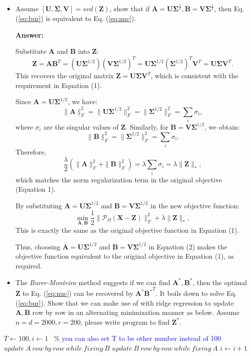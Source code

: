 \documentclass[11pt]{article}
\newcommand{\mtx}[1]{\mathbf{#1}}
\def \mA {\mtx{A}}
\def \mB {\mtx{B}}
\def \mU {\mtx{U}}
\def \mV {\mtx{V}}
\def \mSigma {\mtx{\Sigma}}
\def \mZ {\mtx{Z}}
\begin{document}
\begin{itemize}
	\item Assume $[\mU,\mSigma,\mV]=svd(\mZ)$, show that if $\mA=\mU\mSigma^\frac{1}{2}, \mB=\mV\mSigma^\frac{1}{2}$, then Eq. (\ref{eq:bur}) is equivalent to Eq. (\ref{eq:nuc}).
	
	\textbf{Answer:}

		Substitute \( \mathbf{A} \) and \( \mathbf{B} \) into \( \mathbf{Z} \):
		\[
		\mathbf{Z} = \mathbf{A} \mathbf{B}^T = (\mathbf{U} \mathbf{\Sigma}^{1/2})(\mathbf{V} \mathbf{\Sigma}^{1/2})^T = \mathbf{U} \mathbf{\Sigma}^{1/2} (\mathbf{\Sigma}^{1/2})^T \mathbf{V}^T = \mathbf{U} \mathbf{\Sigma} \mathbf{V}^T.
		\]
		This recovers the original matrix \( \mathbf{Z} = \mathbf{U} \mathbf{\Sigma} \mathbf{V}^T \), which is consistent with the requirement in Equation (1).

		Since \( \mathbf{A} = \mathbf{U} \mathbf{\Sigma}^{1/2} \), we have:
		\[
		\| \mathbf{A} \|_F^2 = \| \mathbf{U} \mathbf{\Sigma}^{1/2} \|_F^2 = \| \mathbf{\Sigma}^{1/2} \|_F^2 = \sum_{i} \sigma_i,
		\]
		where \( \sigma_i \) are the singular values of \( \mathbf{Z} \). Similarly, for \( \mathbf{B} = \mathbf{V} \mathbf{\Sigma}^{1/2} \), we obtain:
		\[
		\| \mathbf{B} \|_F^2 = \| \mathbf{\Sigma}^{1/2} \|_F^2 = \sum_{i} \sigma_i.
		\]
		Therefore,
		\[
		\frac{\lambda}{2} \left( \| \mathbf{A} \|_F^2 + \| \mathbf{B} \|_F^2 \right) = \lambda \sum_{i} \sigma_i = \lambda \| \mathbf{Z} \|_*,
		\]
		which matches the norm regularization term in the original objective (Equation 1).

		By substituting \( \mathbf{A} = \mathbf{U} \mathbf{\Sigma}^{1/2} \) and \( \mathbf{B} = \mathbf{V} \mathbf{\Sigma}^{1/2} \) in the new objective function:
		\[
		\min_{\mathbf{A}, \mathbf{B}} \frac{1}{2} \| \mathcal{P}_{\Omega}(\mathbf{X} - \mathbf{Z}) \|_F^2 + \lambda \| \mathbf{Z} \|_*,
		\]
		This is exactly the same as the original objective function in Equation (1).

		Thus, choosing \( \mathbf{A} = \mathbf{U} \mathbf{\Sigma}^{1/2} \) and \( \mathbf{B} = \mathbf{V} \mathbf{\Sigma}^{1/2} \) in Equation (2) makes the objective function equivalent to the original objective in Equation (1), as required.





	\item The \textit{Burer-Monteiro} method suggests if we can find  $\mA^*,\mB^*$, then the optimal $\mZ$ to Eq. (\ref{eq:nuc}) can be recovered by $\mA^*{\mB^*}^T$. It boils down to solve Eq. (\ref{eq:bur}). Show that we can make use of  with ridge regression to update $\mA, \mB$ row by row in an alternating minimization manner as below. Assume $n=d=2000, r=200$, please write program to find $\mZ^*$.
\end{itemize}
\begin{algorithmic}
	\State $T \gets 100, i\gets 1$ \ \% \textcolor{blue}{you can also set T to be other number instead of 100}
	\State $update \ A \ row \ by \ row \ while \ fixing \ B$
	\State $update \ B \ row \ by \ row \ while \ fixing \ A$
	\State $i \gets i+1$
	\EndIf 
\end{algorithmic}
\end{document}
